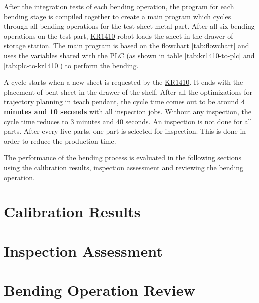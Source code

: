 After the integration tests of each bending operation, the program for each bending stage is compiled together to create a main program which cycles through all bending operations for the test sheet metal part. After all six bending operations on the test part, \hyperref[acro:KR]{KR1410} robot loads the sheet in the drawer of storage station.
The main program is based on the flowchart \ref{tab:flowchart} and uses the variables shared with the \hyperref[acro:PLC]{PLC} (as shown in table \ref{tab:kr1410-to-plc} and \ref{tab:plc-to-kr1410}) to perform the bending.

A cycle starts when a new sheet is requested by the \hyperref[acro:KR]{KR1410}. It ends with the placement of bent sheet in the drawer of the shelf. After all the optimizations for trajectory planning in teach pendant, the cycle time comes out to be around \textbf{4 minutes and 10 seconds} with all inspection jobs. Without any inspection, the cycle time reduces to 3 minutes and 40 seconds. An inspection is not done for all parts. After every five parts, one part is selected for inspection. This is done in order to reduce the production time.

The performance of the bending process is evaluated in the following sections using the calibration results, inspection assessment and reviewing the bending operation.

\section{Calibration Results}
\label{sec:calibration-results}

\FloatBarrier  %

\section{Inspection Assessment}
\label{sec:inspection-assessment}

\FloatBarrier  %

\section{Bending Operation Review}
\label{sec:calibration-results}

\FloatBarrier  %


